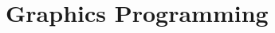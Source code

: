 \documentclass[../notes.tex]{subfiles}
\begin{document}
  \setcounter{chapter}{1}
  \chapter{Graphics Programming}
\end{document}
